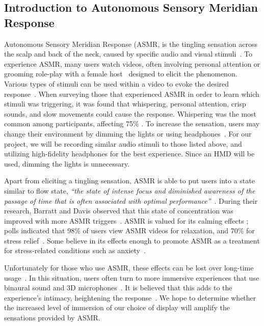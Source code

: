 \documentclass{sigchi}
\newcommand{\inlinequote}[1]{\textit{``#1''}}
\begin{document}
\subsection{Introduction to Autonomous Sensory Meridian Response}
Autonomous Sensory Meridian Response (ASMR, is the tingling sensation across the scalp and back of the neck, caused by specific audio and visual stimuli~\cite{barratt2015autonomous}. To experience ASMR, many users watch videos, often involving personal attention or grooming role-play \cite{andersen2015now,barratt2015autonomous} with a female host~\cite{andersen2015now} designed to elicit the phenomenon. Various types of stimuli can be used within a video to evoke the desired response~\cite{barratt2015autonomous}. When surveying those that experienced ASMR in order to learn which stimuli was triggering, it was found that whispering, personal attention, crisp sounds, and slow movements could cause the response. Whispering was the most common among participants, affecting 75\% \cite{barratt2015autonomous}. To increase the sensation, users may change their environment by dimming the lights or using headphones~\cite{begman2015}. For our project, we will be recording similar audio stimuli to those listed above, and utilizing high-fidelity headphones for the best experience. Since an HMD will be used, dimming the lights is unnecessary.

Apart from eliciting a tingling sensation, ASMR is able to put users into a state similar to flow state, \inlinequote{the state of intense focus and diminished awareness of the passage of time that is often associated with optimal performance}~\cite{barratt2015autonomous}. During their research, Barratt and Davis observed that this state of concentration was improved with more ASMR triggers~\cite{barratt2015autonomous}. ASMR is valued for its calming effects \cite{barratt2015autonomous}; polls indicated that 98\% of users view ASMR videos for relaxation, and 70\% for stress relief~\cite{barratt2015autonomous}. Some believe in its effects enough to promote ASMR as a treatment for stress-related conditions such as anxiety~\cite{andersen2015now,begman2015}.

Unfortunately for those who use ASMR, these effects can be lost over long-time usage~\cite{andersen2015now}. In this situation, users often turn to more immersive experiences that use binaural sound and 3D microphones~\cite{andersen2015now}. It is believed that this adds to the experience's intimacy, heightening the response~\cite{andersen2015now}. We hope to determine whether the increased level of immersion of our choice of display will amplify the sensations provided by ASMR.
\end{document}
